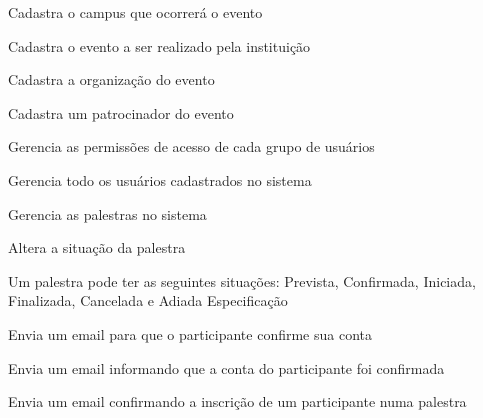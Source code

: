 \documentclass[12pt,a4paper]{article}
\begin{document}
				
				{Cadastra o campus que ocorrerá o evento}
				{%
				
				}
				
				{Cadastra o evento a ser realizado pela instituição }
				{%
				
				}
				
				{Cadastra a organização do evento}
				{%
				
				}
				
				{Cadastra um patrocinador do evento}
				{%
				
				}
				
				{}
				{%
				
				}
				
				{Gerencia as permissões de acesso de cada grupo de usuários}
				{%
				
				}
				
				{Gerencia todo os usuários cadastrados no sistema}
				{%
				
				}
				
				{Gerencia as palestras no sistema}
				{%
				
				}
				
				{Altera a situação da palestra}
				{%
						{Um palestra pode ter as seguintes situações: Prevista, Confirmada, Iniciada, Finalizada, Cancelada e Adiada}
						{Especificação}{}{}%
				
				}
												
				{Envia um email para que o participante confirme sua conta}
				{%
				
				}
				
				{Envia um email informando que a conta do participante foi confirmada}
				{%
				
				}

				{Envia um email confirmando a inscrição de um participante numa palestra}
				{%
				
				}
				
\end{document}
